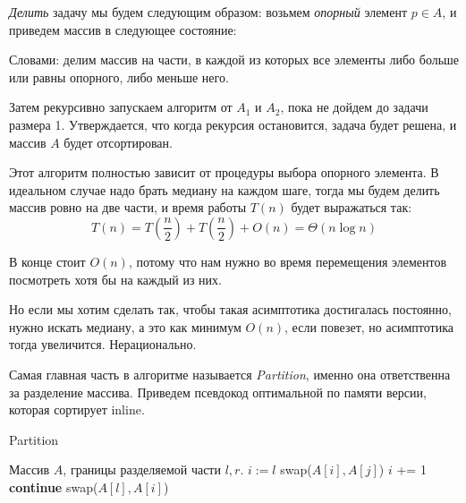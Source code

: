 \documentclass[../main.tex]{subfiles}
\begin{document}
	\textit{Делить} задачу мы будем следующим образом: возьмем \textit{опорный} элемент $p \in A$, и приведем массив в следующее состояние:
	
	\begin{center}
	\end{center}
	
	Словами: делим массив на части, в каждой из которых все элементы либо больше или равны опорного, либо меньше него.
	
	Затем рекурсивно запускаем алгоритм от $A_1$ и $A_2$, пока не дойдем до задачи размера 1. Утверждается, что когда рекурсия остановится, задача будет решена, и массив $A$ будет отсортирован.
	
	Этот алгоритм полностью зависит от процедуры выбора опорного элемента. В идеальном случае надо брать медиану на каждом шаге, тогда мы будем делить массив ровно на две части, и время работы $T(n)$ будет выражаться так:
	\[
	T(n) = T\left(\frac{n}{2}\right) + T\left(\frac{n}{2}\right) + O(n) = \Theta(n\log n)
	\]
	
	В конце стоит $O(n)$, потому что нам нужно во время перемещения элементов посмотреть хотя бы на каждый из них. 
	
	Но если мы хотим сделать так, чтобы такая асимптотика достигалась постоянно, нужно искать медиану, а это как минимум $O(n)$, если повезет, но асимптотика тогда увеличится. Нерационально. 
	
	Самая главная часть в алгоритме называется \textit{Partition}, именно она ответственна за разделение массива. Приведем псевдокод оптимальной по памяти версии, которая сортирует inline. 
	
	\begin{algorithm}[H]
		\caption{Partition}
		\begin{algorithmic}[1]
			\Require Массив $A$, границы разделяемой части $l, r$.
				\State $i := l$
						\State swap($A[i], A[j]$)
						\State $i$ += 1
					\Else
						\State \textbf{continue}
					\EndIf
				\EndFor
				\State swap($A[l], A[i]$)
			\EndFunction
		\end{algorithmic}
	\end{algorithm}
	
\end{document}
